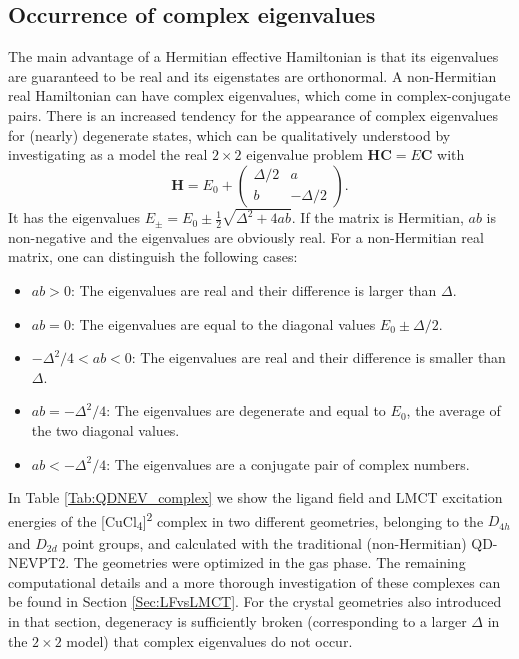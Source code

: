 \subsection{Occurrence of complex eigenvalues}
The main advantage of a Hermitian effective Hamiltonian is that its eigenvalues are guaranteed to be real and its eigenstates are orthonormal. A non-Hermitian real Hamiltonian can have complex eigenvalues, which come in complex-conjugate pairs. There is an increased tendency for the appearance of complex eigenvalues for (nearly) degenerate states, which can be qualitatively understood by investigating as a model the real $2 \times 2$ eigenvalue problem ${\mathbf{HC}} = E{\mathbf{C}}$ with
	\begin{equation}
	{\mathbf{H}} = {E_0} + \left( {\begin{array}{*{20}{c}}
  {\Delta /2}&a \\ 
  b&{ - \Delta /2} 
\end{array}} \right).
\end{equation}
It has the eigenvalues ${E_ \pm } = {E_0} \pm \frac{1}{2}\sqrt {{\Delta ^2} + 4ab} $. If the matrix is Hermitian, $ab$ is non-negative and the eigenvalues are obviously real. For a non-Hermitian real matrix, one can distinguish the following cases:
\begin{itemize}
\item$ab > 0$: The eigenvalues are real and their difference is larger than $\Delta$.
\item$ab = 0$: The eigenvalues are equal to the diagonal values ${E_0} \pm \Delta /2$.
\item$ - {\Delta ^2}/4 < ab < 0$: The eigenvalues are real and their difference is smaller than $\Delta$.
\item$ab =  - {\Delta ^2}/4$: The eigenvalues are degenerate and equal to $E_0$, the average of the two diagonal values.
\item$ab <  - {\Delta ^2}/4$: The eigenvalues are a conjugate pair of complex numbers.
\end{itemize}
In Table \ref{Tab:QDNEV_complex} we show the ligand field and LMCT excitation energies of the [CuCl\textsubscript{4}]\textsuperscript{2\textminus} complex in two different geometries, belonging to the $D_{4h}$ and $D_{2d}$ point groups, and calculated with the traditional (non-Hermitian) QD-NEVPT2. The geometries were optimized in the gas phase. The remaining computational details and a more thorough investigation of these complexes can be found in Section \ref{Sec:LFvsLMCT}. For the crystal geometries also introduced in that section, degeneracy is sufficiently broken (corresponding to a larger $\Delta$ in the $2\times 2$ model) that complex eigenvalues do not occur.
